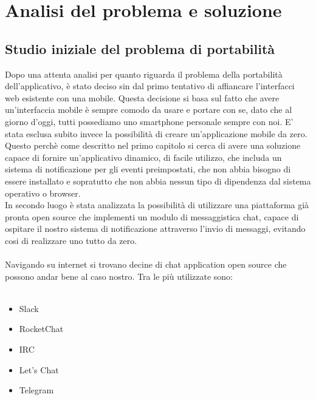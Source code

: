 \section{Analisi del problema e soluzione}


\subsection{Studio iniziale del problema di portabilità}
Dopo una attenta analisi per quanto riguarda il problema della portabilità dell'applicativo, è stato deciso sin dal primo tentativo di affiancare l'interfacci web esistente con una mobile. Questa decisione si basa sul fatto che avere un'interfaccia mobile è sempre comodo da usare e portare con se, dato che al giorno d'oggi, tutti possediamo uno smartphone personale sempre con noi. E' stata esclusa subito invece la possibilità di creare un'applicazione mobile da zero. Questo perchè come descritto nel primo capitolo si cerca di avere una soluzione capace di fornire un'applicativo dinamico, di facile utilizzo, che includa un sistema di notificazione per gli eventi preimpostati, che non abbia bisogno di essere installato e sopratutto che non abbia nessun tipo di dipendenza dal sistema operativo o browser.\\ 
 In secondo luogo è stata analizzata la possibilità di utilizzare una piattaforma già pronta open source che implementi un modulo di messaggistica chat, capace di ospitare il nostro sistema di notificazione attraverso l'invio di messaggi, evitando cosi di realizzare uno tutto da zero.\\\\
Navigando su internet si trovano decine di chat application open source che possono andar bene al caso nostro. Tra le più utilizzate sono: \\\\

\begin{itemize}
\item Slack 
\item RocketChat
\item IRC
\item Let's Chat
\item Telegram 
\end{itemize}


